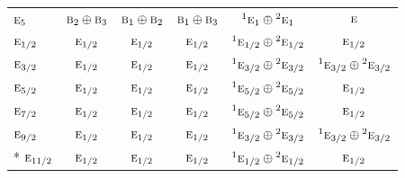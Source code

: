 \documentclass[10pt,a4paper]{article}
\numberwithin{equation}{section}
\newcommand{\irr}[1]{\text{\normalfont\scshape #1}}
\newcommand{\conjpair}[1]{{}^{#1}}
\begin{document}
{\begin{longtable}{@{}lccccc@{}}
$\irr{e}_{5}$ & $\irr{b}_{2}\oplus \irr{b}_{3}$ & $\irr{b}_{1}\oplus \irr{b}_{2}$ & $\irr{b}_{1}\oplus \irr{b}_{3}$ & $\conjpair{1}\irr{e}_{1}\oplus \conjpair{2}\irr{e}_{1}$ & $\irr{e}$\\
$\irr{e}_{1/2}$ & $\irr{e}_{1/2}$ & $\irr{e}_{1/2}$ & $\irr{e}_{1/2}$ & $\conjpair{1}\irr{e}_{1/2}\oplus \conjpair{2}\irr{e}_{1/2}$ & $\irr{e}_{1/2}$\\
$\irr{e}_{3/2}$ & $\irr{e}_{1/2}$ & $\irr{e}_{1/2}$ & $\irr{e}_{1/2}$ & $\conjpair{1}\irr{e}_{3/2}\oplus \conjpair{2}\irr{e}_{3/2}$ & $\conjpair{1}\irr{e}_{3/2}\oplus \conjpair{2}\irr{e}_{3/2}$\\
$\irr{e}_{5/2}$ & $\irr{e}_{1/2}$ & $\irr{e}_{1/2}$ & $\irr{e}_{1/2}$ & $\conjpair{1}\irr{e}_{5/2}\oplus \conjpair{2}\irr{e}_{5/2}$ & $\irr{e}_{1/2}$\\
$\irr{e}_{7/2}$ & $\irr{e}_{1/2}$ & $\irr{e}_{1/2}$ & $\irr{e}_{1/2}$ & $\conjpair{1}\irr{e}_{5/2}\oplus \conjpair{2}\irr{e}_{5/2}$ & $\irr{e}_{1/2}$\\
$\irr{e}_{9/2}$ & $\irr{e}_{1/2}$ & $\irr{e}_{1/2}$ & $\irr{e}_{1/2}$ & $\conjpair{1}\irr{e}_{3/2}\oplus \conjpair{2}\irr{e}_{3/2}$ & $\conjpair{1}\irr{e}_{3/2}\oplus \conjpair{2}\irr{e}_{3/2}$\\*
$\irr{e}_{11/2}$ & $\irr{e}_{1/2}$ & $\irr{e}_{1/2}$ & $\irr{e}_{1/2}$ & $\conjpair{1}\irr{e}_{1/2}\oplus \conjpair{2}\irr{e}_{1/2}$ & $\irr{e}_{1/2}$\\
\bottomrule\end{longtable}}
\end{document}
